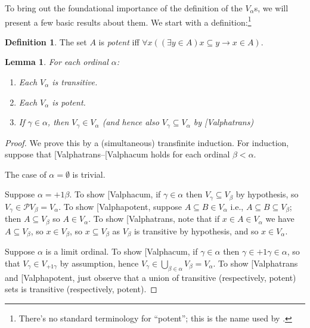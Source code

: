 \documentclass[10pt,a4paper]{article}
\makeatletter
\theoremstyle{plain}
\newtheorem{lem}[thm]{Lemma}
\theoremstyle{definition}
\newtheorem{defn}[thm]{Definition}
\theoremstyle{remark}
\newcommand*{\ollabel}[1]{\label{#1}}
\newcommand{\olref}{\@ifnextchar[{\olref@i}{\olref@final}}
\def\olref@i[#1]{\@ifnextchar[{\olref@ii}{\olref@final}}
\def\olref@ii[#1]{\@ifnextchar[{\olref@iii}{\olref@final}}
\def\olref@iii[#1]{\olref@final}
\def\olref@final#1{\ref{#1}}
\providecommand{\lif}{\mathbin{\rightarrow}}
\providecommand{\ordsucc}{\mathord{+1}}
\providecommand{\Pow}{\mathcal{P}}
\providecommand{\citet}[1]{\cite{#1}}
\makeatother
\begin{document}
To bring out the foundational importance of the definition of the
$V_\alpha$s, we will present a few basic results about them. We start with a definition:\footnote{There's no standard terminology for ``potent''; this is the name used by \citet{ButtonLT1}.}
\begin{defn}
	The set $A$ is \emph{potent} iff $\forall x((\exists y \in A)x \subseteq y \lif x \in A)$. 
\end{defn}
\begin{lem}\ollabel{Valphabasicprops}
For each ordinal $\alpha$:
\begin{enumerate}
	\item\ollabel{Valphatrans} Each $V_\alpha$ is transitive.
	\item\ollabel{Valphapotent} Each $V_\alpha$ is potent.
	\item\ollabel{Valphacum} If $\gamma \in \alpha$, then $V_\gamma
	\in V_\alpha$ (and hence also $V_\gamma \subseteq V_\alpha$ by
	\olref{Valphatrans})
\end{enumerate}
\end{lem}

\begin{proof}
We prove this by a (simultaneous) transfinite induction.  For
induction, suppose that \olref{Valphatrans}--\olref{Valphacum} holds
for each ordinal $\beta < \alpha$. 

The case of $\alpha = \emptyset$ is trivial. 

Suppose $\alpha = \ordsucc{\beta}$. To show \olref{Valphacum}, if
$\gamma \in \alpha$ then $V_\gamma \subseteq V_\beta$ by hypothesis,
so $V_\gamma \in \Pow{V_\beta} = V_\alpha$. To show
\olref{Valphapotent}, suppose $A \subseteq B \in V_\alpha$ i.e., $A
\subseteq B \subseteq V_\beta$; then $A \subseteq V_\beta$ so $A \in
V_\alpha$. To show \olref{Valphatrans}, note that if $x \in A \in
V_\alpha$ we have $A \subseteq V_\beta$, so $x \in V_\beta$, so $x
\subseteq V_\beta$ as $V_\beta$ is transitive by hypothesis, and so $x
\in V_\alpha$. 

Suppose $\alpha$ is  a limit ordinal. To show \olref{Valphacum}, if
$\gamma \in \alpha$ then $\gamma \in \ordsucc{\gamma} \in \alpha$, so
that $V_\gamma \in V_{\ordsucc{\gamma}}$ by assumption, hence
$V_\gamma \in \bigcup_{\beta \in \alpha} V_\beta = V_\alpha$. To show
\olref{Valphatrans} and \olref{Valphapotent}, just observe that a
union of transitive (respectively, potent) sets is transitive
(respectively, potent). 
\end{proof}
\end{document}
